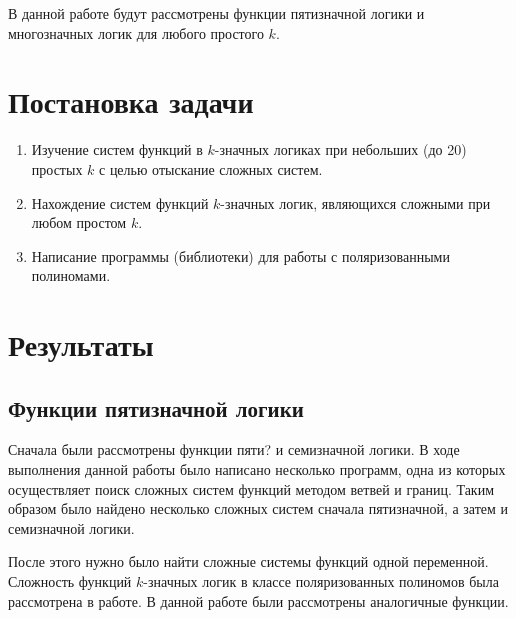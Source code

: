 \documentclass[bibliography=totoc, a4paper, 12pt]{extarticle}
\let\stdsection\section
\renewcommand\section{\newpage\stdsection}
\begin{document}
В данной работе будут рассмотрены функции пятизначной логики и многозначных
логик для любого простого $k$.


\section{Постановка задачи}
\begin{enumerate}
\item Изучение систем функций в $k$-значных логиках при небольших (до 20)
простых $k$ с целью отыскание сложных систем.

\item Нахождение систем функций $k$-значных логик, являющихся сложными при любом
простом $k$.

\item Написание программы (библиотеки) для работы с поляризованными полиномами.
\end{enumerate}

\section{Результаты}

\subsection{Функции пятизначной логики}

Сначала были рассмотрены функции пяти? и семизначной логики. В ходе выполнения
данной работы было написано несколько программ, одна из которых осуществляет
поиск сложных систем функций методом ветвей и границ. Таким образом было найдено
несколько сложных систем сначала пятизначной, а затем и семизначной логики.

После этого нужно было найти сложные системы функций одной переменной. Сложность
функций $k$-значных логик в классе поляризованных полиномов была рассмотрена в
работе\cite{ss04}. В данной работе были рассмотрены аналогичные функции.
\end{document}
